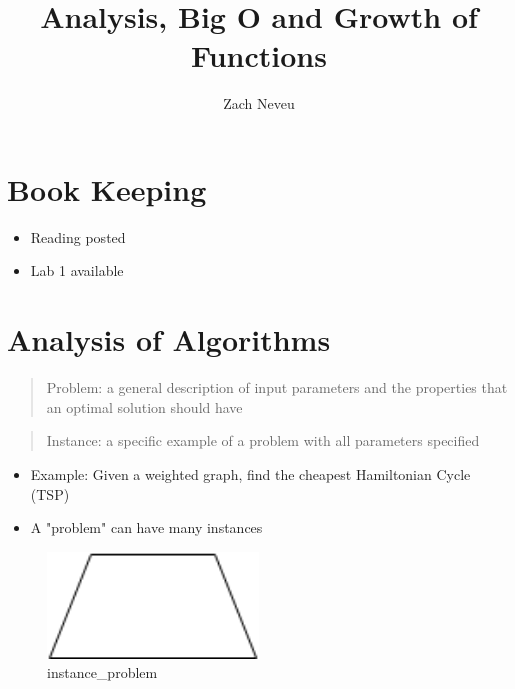 \documentclass[12pt, letter]{article}
\author{Zach Neveu}
\title{ Analysis, Big O and Growth of Functions }
\begin{document}
\maketitle

\section{Book Keeping}%
\label{sec:book_keeping}
\begin{itemize}
	\item Reading posted
	\item Lab 1 available
\end{itemize}

\section{Analysis of Algorithms}%
\label{sec:analysis_of_algorithms}
\begin{quote}
	Problem: a general description of input parameters and the properties that an optimal solution should have
\end{quote}
\begin{quote}
	Instance: a specific example of a problem with all parameters specified
\end{quote}
\begin{itemize}
	\item Example: Given a weighted graph, find the cheapest Hamiltonian Cycle (TSP)
	\item A "problem" can have many instances
\end{itemize}

\begin{figure}[h]
	\centering
	\includegraphics[width=0.5\textwidth]{Page-1}
	\caption{instance\_problem}
	\label{fig:instance_problem}
\end{figure}
\end{document}
